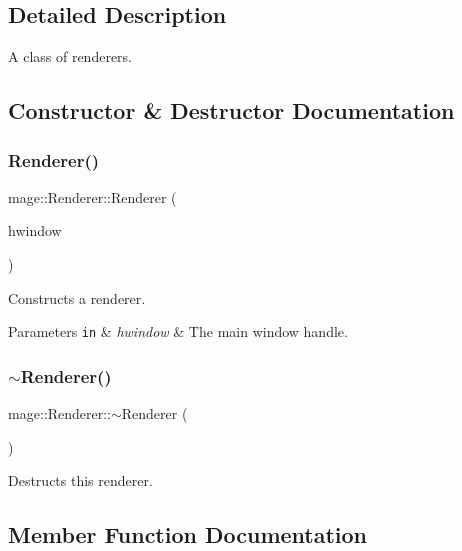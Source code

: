 \subsection{Detailed Description}
A class of renderers. 

\subsection{Constructor \& Destructor Documentation}
\hypertarget{classmage_1_1_renderer_a762dcda433c319af237d1dfd9bc6095f}{}\label{classmage_1_1_renderer_a762dcda433c319af237d1dfd9bc6095f} 
\subsubsection{\texorpdfstring{Renderer()}{Renderer()}}
{\footnotesize\ttfamily mage\+::\+Renderer\+::\+Renderer (\begin{DoxyParamCaption}\item[{H\+W\+ND}]{hwindow }\end{DoxyParamCaption})}

Constructs a renderer.


\begin{DoxyParams}[1]{Parameters}
\mbox{\tt in}  & {\em hwindow} & The main window handle. \\
\hline
\end{DoxyParams}
\hypertarget{classmage_1_1_renderer_a997e041f28cc71d069d1ab7d29fe6ced}{}\label{classmage_1_1_renderer_a997e041f28cc71d069d1ab7d29fe6ced} 
\subsubsection{\texorpdfstring{$\sim$\+Renderer()}{~Renderer()}}
{\footnotesize\ttfamily mage\+::\+Renderer\+::$\sim$\+Renderer (\begin{DoxyParamCaption}{ }\end{DoxyParamCaption})\hspace{0.3cm}{\ttfamily [virtual]}}

Destructs this renderer. 

\subsection{Member Function Documentation}
\hypertarget{classmage_1_1_renderer_a872e88f421405b06a995a6fb231d59ec}{}\label{classmage_1_1_renderer_a872e88f421405b06a995a6fb231d59ec} 
